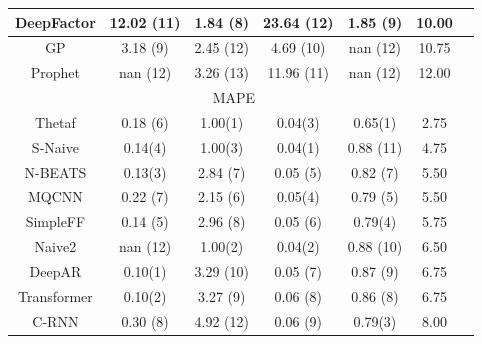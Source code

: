 \begin{table}[htb]
\begin{tabular}{ccccccc}
    DeepFactor  & \cellcolor{red!50} 12.02 (11) & 1.84 (8)                      & \cellcolor{red!50} 23.64 (12) & 1.85 (9)                      & 10.00               \\\hline
    GP          & 3.18 (9)                      & \cellcolor{red!50} 2.45 (12)  & \cellcolor{red!10} 4.69 (10)  & \cellcolor{red!70} nan (12)   & 10.75               \\\hline
    Prophet     & \cellcolor{red!70} nan (12)   & \cellcolor{red!70} 3.26 (13)  & \cellcolor{red!30} 11.96 (11) & \cellcolor{red!70} nan (12)   & 12.00               \\\hline
    \multicolumn{6}{c}{\cellcolor{gray!25}MAPE}                                                                                                                       \\
    \hline
    Thetaf      & 0.18 (6)                      & 1.00(1) \cellcolor{green!100} & 0.04(3) \cellcolor{green!50}  & 0.65(1) \cellcolor{green!100} & 2.75                \\\hline
    S-Naive     & 0.14(4) \cellcolor{green!30}  & 1.00(3) \cellcolor{green!50}  & 0.04(1) \cellcolor{green!100} & \cellcolor{red!50} 0.88 (11)  & 4.75                \\\hline
    N-BEATS     & 0.13(3) \cellcolor{green!50}  & 2.84 (7)                      & 0.05 (5)                      & 0.82 (7)                      & 5.50                \\\hline
    MQCNN       & 0.22 (7)                      & 2.15 (6)                      & 0.05(4) \cellcolor{green!30}  & 0.79 (5)                      & 5.50                \\\hline
    SimpleFF    & 0.14 (5)                      & 2.96 (8)                      & 0.05 (6)                      & 0.79(4) \cellcolor{green!30}  & 5.75                \\\hline
    Naive2      & \cellcolor{red!70} nan (12)   & 1.00(2) \cellcolor{green!70}  & 0.04(2) \cellcolor{green!70}  & \cellcolor{red!30} 0.88 (10)  & 6.50                \\\hline
    DeepAR      & 0.10(1) \cellcolor{green!100} & \cellcolor{red!10} 3.29 (10)  & 0.05 (7)                      & 0.87 (9)                      & 6.75                \\\hline
    Transformer & 0.10(2) \cellcolor{green!70}  & 3.27 (9)                      & 0.06 (8)                      & 0.86 (8)                      & 6.75                \\\hline
    C-RNN       & 0.30 (8)                      & \cellcolor{red!50} 4.92 (12)  & 0.06 (9)                      & 0.79(3) \cellcolor{green!50}  & 8.00                \\\hline

\end{tabular}
\end{table}
